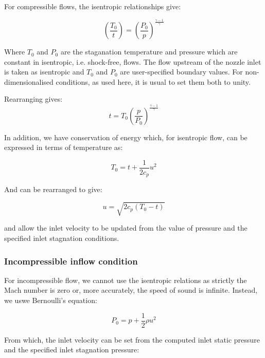 For compressible flows, the isentropic relationships give:

\begin{equation}
  \left( \frac{T_0}{t} \right ) =  \left( \frac{P_0}{p} \right ) ^{\frac{\gamma-1}{\gamma}}
  \label{eqn-t-p-isen-1}
\end{equation}

Where $T_0$ and $P_0$ are the staganation temperature and pressure which are constant in
isentropic, i.e. shock-free, flows.
The flow upstream of the nozzle inlet is taken as isentropic and $T_0$ and $P_0$ 
are user-specified boundary values. 
For non-dimensionalised conditions, as used here, it is usual to set them both to unity.

Rearranging  gives:
\begin{equation}
  t = T_0 \left( \frac{p}{P_0} \right ) ^{\frac{\gamma-1}{\gamma}}
  \label{eqn-t-p-isen-2}
\end{equation}

In addition, we have conservation of energy which, for isentropic flow, can be 
expressed in terms of temperature as:

\begin{equation}
  T_0 = t + \frac{1}{2c_p}u^2
  \label{eqn-energy}
\end{equation}

And can be rearranged to give:

\begin{equation}
  u = \sqrt{2 c_p (T_0 - t)}
  \label{eqn-uin-isen}
\end{equation}

 and  allow the inlet velocity to be updated from
the value of pressure and the specified inlet stagnation conditions.


\subsubsection{Incompressible inflow condition}

For incompressible flow, we cannot use the isentropic relations as strictly the Mach number is
zero or, more accurately, the speed of sound is infinite. Instead, we uswe Bernoulli's equation:

\begin{equation}
  P_0 = p + \frac{1}{2}\rho u^2
  \label{eqn-Bernoulli}
\end{equation}

From which, the inlet velocity can be set from the computed inlet static pressure and
the specified inlet stagnation pressure:

